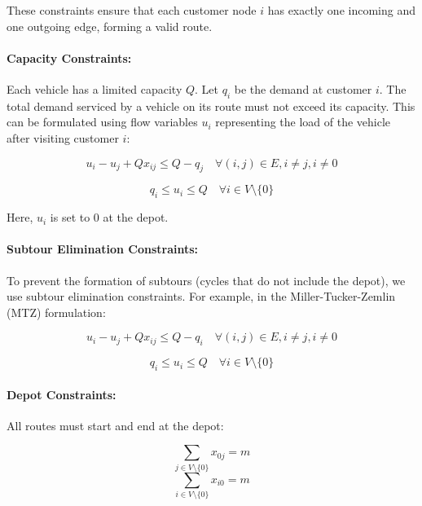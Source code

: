 \documentclass[
]{article}
\begin{document}
These constraints ensure that each customer node \( i \) has exactly one incoming and one outgoing edge, forming a valid route.

\paragraph{Capacity Constraints:}
Each vehicle has a limited capacity \( Q \). Let \( q_i \) be the demand at customer \( i \). The total demand serviced by a vehicle on its route must not exceed its capacity. This can be formulated using flow variables \( u_i \) representing the load of the vehicle after visiting customer \( i \):

\begin{equation}
  u_i - u_j + Q x_{ij} \leq Q - q_j \quad \forall (i, j) \in E, i \neq j, i \neq 0
\end{equation}

\begin{equation}
  q_i \leq u_i \leq Q \quad \forall i \in V \setminus \{0\}
\end{equation}

Here, \( u_i \) is set to 0 at the depot.

\paragraph{Subtour Elimination Constraints:}
To prevent the formation of subtours (cycles that do not include the depot), we use subtour elimination constraints. For example, in the Miller-Tucker-Zemlin (MTZ) formulation:

\begin{equation}
  u_i - u_j + Q x_{ij} \leq Q - q_i \quad \forall (i, j) \in E, i \neq j, i \neq 0
\end{equation}

\begin{equation}
  q_i \leq u_i \leq Q \quad \forall i \in V \setminus \{0\}
\end{equation}

\paragraph{Depot Constraints:}
All routes must start and end at the depot:

\begin{equation}
  \sum_{j \in V \setminus \{0\}} x_{0j} = m
\end{equation}
\begin{equation}
  \sum_{i \in V \setminus \{0\}} x_{i0} = m
\end{equation}
\end{document}
